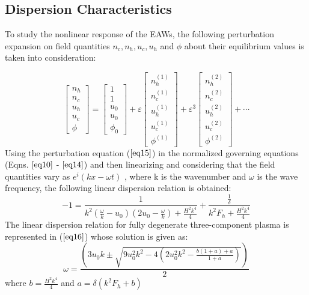 \documentclass[journal]{IEEEtran}
\begin{document}
\subsection{Dispersion Characteristics}\label{1}

To study the nonlinear response of the EAWs, the following perturbation expansion on field quantities $n_c,n_h,u_c,u_h$  and $\phi$ about their equilibrium values is taken into consideration:

\begin{equation}\label{eq15}
\left[\begin{array}{c}
n_{h} \\
n_{c} \\
u_{h} \\
u_{c} \\
\phi
\end{array}\right]=\left[\begin{array}{c}
1 \\
1 \\
u_{0} \\
u_{0} \\
\phi_{0}
\end{array}\right]+\varepsilon\left[\begin{array}{c}
n_{h}^{(1)} \\
n_{c}^{(1)} \\
u_{h}^{(1)} \\
u_{c}^{(1)} \\
\phi^{(1)}
\end{array}\right]+\varepsilon^{3}\left[\begin{array}{c}
n_{h}^{(2)} \\
n_{c}^{(2)} \\
u_{h}^{(2)} \\
u_{c}^{(2)} \\
\phi^{(2)}
\end{array}\right]+\cdots
\end{equation}
Using the perturbation equation ($\ref{eq15}$) in the normalized governing equations (Eqns. $\ref{eq10}$ - $\ref{eq14}$) and then linearizing and considering that the field quantities vary as $e^i(kx-{\omega}t)$ , where k is the wavenumber and $\omega$ is the wave frequency, the following linear dispersion relation is obtained:
\begin{equation}\label{eq16}
-1=\frac{1}{k^2\left(\frac{\omega}{k}-u_0\right)\left(2u_0-\frac{\omega}{k}\right)+\frac{H^2k^4}{4}}+{\frac{\frac{1}{\delta}}{k^2F_h+\frac{H^2k^4}{4}}}
\end{equation}
The linear dispersion relation for fully degenerate three-component plasma is represented in ($\ref{eq16}$) whose solution is given as:
\begin{equation}\label{eq17}
\omega=\frac{\left(3u_0k\pm{\sqrt{9u_0^2k^2-4\left(2u_0^2k^2-\frac{b(1+a)+a}{1+a}\right)}} \right)}{2}
\end{equation}
where $b = \frac{H^2 k^4}{4}$ and $a = \delta(k^2 F_h+b)$
\end{document}
